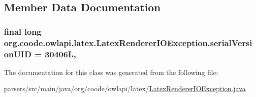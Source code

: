 \subsection{Member Data Documentation}
\hypertarget{classorg_1_1coode_1_1owlapi_1_1latex_1_1_latex_renderer_i_o_exception_a7f7915b1db7e472b90b192f7b85b31b4}{
\subsubsection[{serial\-Version\-U\-I\-D}]{\setlength{\rightskip}{0pt plus 5cm}final long org.\-coode.\-owlapi.\-latex.\-Latex\-Renderer\-I\-O\-Exception.\-serial\-Version\-U\-I\-D = 30406\-L\hspace{0.3cm}{\ttfamily [static]}, {\ttfamily [private]}}}\label{classorg_1_1coode_1_1owlapi_1_1latex_1_1_latex_renderer_i_o_exception_a7f7915b1db7e472b90b192f7b85b31b4}


The documentation for this class was generated from the following file\-:\begin{DoxyCompactItemize}
\item 
parsers/src/main/java/org/coode/owlapi/latex/\hyperlink{_latex_renderer_i_o_exception_8java}{Latex\-Renderer\-I\-O\-Exception.\-java}\end{DoxyCompactItemize}
